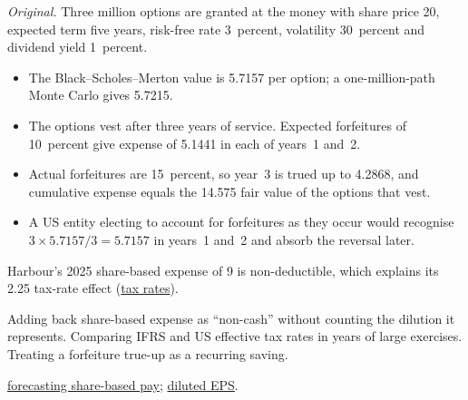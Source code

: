 \begin{qfmethod}
 \emph{Original.} Three million options are granted at the money with share price 20, expected term five years, risk-free rate 3~percent, volatility 30~percent and dividend yield 1~percent.
\begin{itemize}
\item The Black--Scholes--Merton value is 5.7157 per option; a one-million-path Monte Carlo gives 5.7215.
\item The options vest after three years of service. Expected forfeitures of 10~percent give expense of 5.1441 in each of years~1 and~2.
\item Actual forfeitures are 15~percent, so year~3 is trued up to 4.2868, and cumulative expense equals the 14.575 fair value of the options that vest.
\item A US entity electing to account for forfeitures as they occur would recognise $3\times5.7157/3=5.7157$ in years~1 and~2 and absorb the reversal later.
\end{itemize}
Harbour's 2025 share-based expense of 9 is non-deductible, which explains its 2.25 tax-rate effect (\hyperref[meth:tax-rate-measures]{tax rates}).

 Adding back share-based expense as ``non-cash'' without counting the dilution it represents. Comparing IFRS and US effective tax rates in years of large exercises. Treating a forfeiture true-up as a recurring saving.

 \hyperref[meth:share-based-compensation-modelling]{forecasting share-based pay}; \hyperref[meth:earnings-per-share]{diluted EPS}.

\end{qfmethod}

